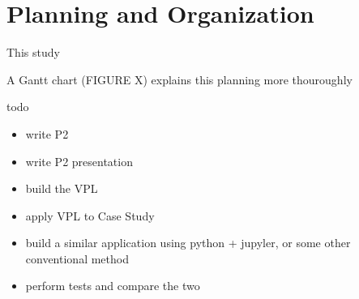 \newpage
\section{Planning and Organization}

This study 



A Gantt chart (FIGURE X) explains this planning more thouroughly

todo
\begin{itemize}
    \item write P2
    \item write P2 presentation
    \item build the VPL
    \item apply VPL to Case Study
    \item build a similar application using python + jupyler, or some other conventional method
    \item perform tests and compare the two
\end{itemize}




